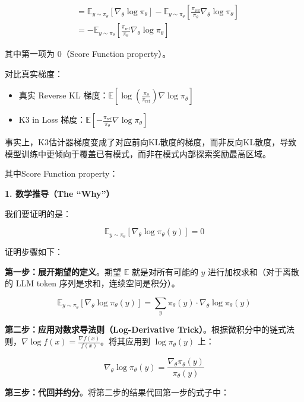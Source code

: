 \[
\begin{aligned}
&=\mathbb{E}_{y\sim\pi_\theta}\left[\nabla_\theta\log\pi_\theta\right]
-\mathbb{E}_{y\sim\pi_\theta}\left[
\frac{\pi_{\mathrm{ref}}}{\pi_\theta}\nabla_\theta\log\pi_\theta
\right] \\
&=-\mathbb{E}_{y\sim\pi_\theta}\left[
\frac{\pi_{\mathrm{ref}}}{\pi_\theta}\nabla_\theta\log\pi_\theta
\right]
\end{aligned}
\]

其中第一项为 \(0\)（Score Function property）。

对比真实梯度：

\begin{itemize}
\tightlist
\item
  真实 Reverse KL 梯度：\(\mathbb{E}\left[\log\left(\frac{\pi_\theta}{\pi_{\mathrm{ref}}}\right)\nabla\log\pi_\theta\right]\)
\item
  K3 in Loss 梯度：\(\mathbb{E}\left[-\frac{\pi_{\mathrm{ref}}}{\pi_\theta}\nabla\log\pi_\theta\right]\)
\end{itemize}

事实上，K3估计器梯度变成了对应前向KL散度的梯度，而非反向KL散度，导致模型训练中更倾向于覆盖已有模式，而非在模式内部探索奖励最高区域。

其中Score Function property：

\textbf{1. 数学推导（The ``Why''）}

我们要证明的是：

\[
\mathbb{E}_{y\sim\pi_\theta}\left[\nabla_\theta\log\pi_\theta(y)\right]=0
\]

证明步骤如下：

\textbf{第一步：展开期望的定义}。期望 \(\mathbb{E}\) 就是对所有可能的 \(y\) 进行加权求和（对于离散的 LLM token 序列是求和，连续空间是积分）。

\[
\mathbb{E}_{y\sim\pi_\theta}\left[\nabla_\theta\log\pi_\theta(y)\right]
=\sum_y \pi_\theta(y)\cdot\nabla_\theta\log\pi_\theta(y)
\]

\textbf{第二步：应用对数求导法则（Log-Derivative Trick）}。根据微积分中的链式法则，\(\nabla\log f(x)=\frac{\nabla f(x)}{f(x)}\)。将其应用到 \(\log\pi_\theta(y)\) 上：

\[
\nabla_\theta\log\pi_\theta(y)
=\frac{\nabla_\theta\pi_\theta(y)}{\pi_\theta(y)}
\]

\textbf{第三步：代回并约分}。将第二步的结果代回第一步的式子中：


